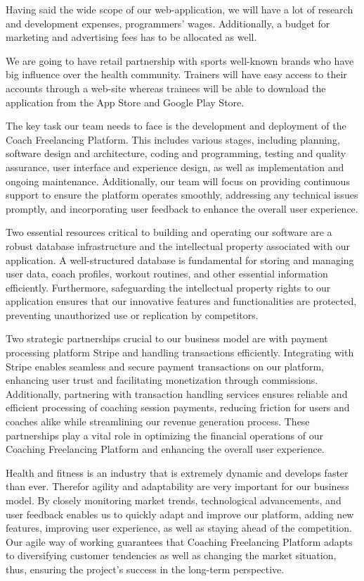 Having said the wide scope of our web-application, we will have a lot of research and development expenses, programmers’ wages. Additionally, a budget for marketing and advertising fees has to be allocated as well. 

We are going to have retail partnership with sports well-known brands who have big influence over the health community. Trainers will have easy access to their accounts through a web-site whereas trainees will be able to download the application from the App Store and Google Play Store. 

The key task our team needs to face is the development and deployment of the Coach Freelancing Platform. This includes various stages, including planning, software design and architecture, coding and programming, testing and quality assurance, user interface and experience design, as well as implementation and ongoing maintenance. Additionally, our team will focus on providing continuous support to ensure the platform operates smoothly, addressing any technical issues promptly, and incorporating user feedback to enhance the overall user experience.

Two essential resources critical to building and operating our software are a robust database infrastructure and the intellectual property associated with our application. A well-structured database is fundamental for storing and managing user data, coach profiles, workout routines, and other essential information efficiently. Furthermore, safeguarding the intellectual property rights to our application ensures that our innovative features and functionalities are protected, preventing unauthorized use or replication by competitors.

Two strategic partnerships crucial to our business model are with payment processing platform Stripe and handling transactions efficiently. Integrating with Stripe enables seamless and secure payment transactions on our platform, enhancing user trust and facilitating monetization through commissions. Additionally, partnering with transaction handling services ensures reliable and efficient processing of coaching session payments, reducing friction for users and coaches alike while streamlining our revenue generation process. These partnerships play a vital role in optimizing the financial operations of our Coaching Freelancing Platform and enhancing the overall user experience.

Health and fitness is an industry that is extremely dynamic and develops faster than ever. Therefor agility and adaptability are very important for our business model. By closely monitoring market trends, technological advancements, and user feedback enables us to quickly adapt and improve our platform, adding new features, improving user experience, as well as staying ahead of the competition. Our agile way of working guarantees that Coaching Freelancing Platform adapts to diversifying customer tendencies as well as changing the market situation, thus, ensuring the project’s success in the long-term perspective.
\clearpage



